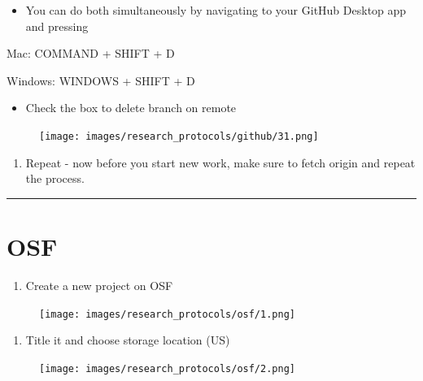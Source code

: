 \documentclass[
]{book}
\providecommand{\tightlist}{%
  \setlength{\itemsep}{0pt}\setlength{\parskip}{0pt}}
\begin{document}
\begin{itemize}
\tightlist
\item
  You can do both simultaneously by navigating to your GitHub Desktop app and pressing
\end{itemize}

Mac: COMMAND + SHIFT + D

Windows: WINDOWS + SHIFT + D

\begin{itemize}
\tightlist
\item
  Check the box to delete branch on remote
\end{itemize}

\begin{figure}
\centering
\texttt{[image: images/research\_protocols/github/31.png]}
\caption{}
\end{figure}

\begin{enumerate}
\def\labelenumi{\arabic{enumi}.}
\setcounter{enumi}{9}
\tightlist
\item
  Repeat - now before you start new work, make sure to fetch origin and repeat the process.
\end{enumerate}

\begin{center}\rule{0.5\linewidth}{0.5pt}\end{center}

\hypertarget{osf}{%
\section{OSF}\label{osf}}

\begin{enumerate}
\def\labelenumi{\arabic{enumi}.}
\tightlist
\item
  Create a new project on OSF
\end{enumerate}

\begin{figure}
\centering
\texttt{[image: images/research\_protocols/osf/1.png]}
\caption{}
\end{figure}

\begin{enumerate}
\def\labelenumi{\arabic{enumi}.}
\setcounter{enumi}{1}
\tightlist
\item
  Title it and choose storage location (US)
\end{enumerate}

\begin{figure}
\centering
\texttt{[image: images/research\_protocols/osf/2.png]}
\caption{}
\end{figure}
\end{document}
